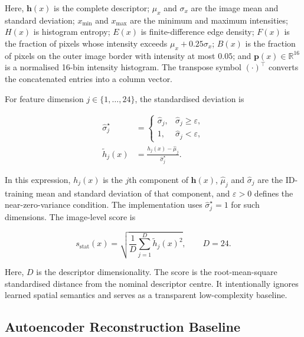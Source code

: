 \documentclass[fleqn,12pt]{olplainarticle}
\begin{document}
Here, $\mathbf{h}(x)$ is the complete descriptor; $\mu_x$ and $\sigma_x$ are
the image mean and standard deviation; $x_{\min}$ and $x_{\max}$ are the
minimum and maximum intensities; $H(x)$ is histogram entropy; $E(x)$ is
finite-difference edge density; $F(x)$ is the fraction of pixels whose
intensity exceeds $\mu_x+0.25\sigma_x$; $B(x)$ is the fraction of pixels on
the outer image border with intensity at most $0.05$; and
$\mathbf{p}(x)\in\mathbb{R}^{16}$ is a normalised 16-bin intensity histogram.
The transpose symbol $(\cdot)^{\top}$ converts the concatenated entries into a
column vector.

For feature dimension $j\in\{1,\ldots,24\}$, the standardised deviation is

\begin{equation}
    \begin{aligned}
        \widehat{\sigma}^{\star}_j
        &=
        \begin{cases}
            \widehat{\sigma}_j, & \widehat{\sigma}_j\geq\varepsilon,\\
            1, & \widehat{\sigma}_j<\varepsilon,
        \end{cases}\\[2pt]
        \widetilde{h}_j(x)
        &=
        \frac{h_j(x)-\widehat{\mu}_j}{\widehat{\sigma}^{\star}_j}.
    \end{aligned}
    \label{eq:method_statistics_standardisation}
\end{equation}

In this expression, $h_j(x)$ is the $j$th component of $\mathbf{h}(x)$,
$\widehat{\mu}_j$ and $\widehat{\sigma}_j$ are the ID-training mean and
standard deviation of that component, and $\varepsilon>0$ defines the
near-zero-variance condition. The implementation uses
$\widehat{\sigma}^{\star}_j=1$ for such dimensions. The image-level score is

\begin{equation}
    s_{\mathrm{stat}}(x)
    =
    \sqrt{
        \frac{1}{D}
        \sum_{j=1}^{D}
        \widetilde{h}_j(x)^2
    },
    \qquad
    D=24.
    \label{eq:method_statistics_score}
\end{equation}

Here, $D$ is the descriptor dimensionality. The score is the root-mean-square
standardised distance from the nominal descriptor centre. It intentionally
ignores learned spatial semantics and serves as a transparent
low-complexity baseline.

\subsection{Autoencoder Reconstruction Baseline}
\label{subsec:autoencoder_method}
\end{document}
